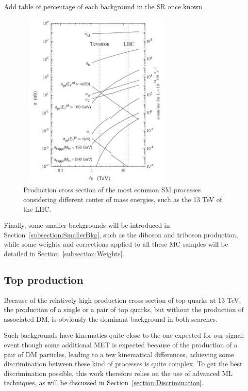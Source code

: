 \documentclass[a4paper, 10pt, openright]{report}
\begin{document}
\color{red} Add table of percentage of each background in the SR once known \color{black}

\begin{figure}[htbp]
\begin{center}
\includegraphics[width=8cm, height=9cm]{figs/ProcessesXS.png}
\caption{Production cross section of the most common \ac{SM} processes considering different center of mass energies, such as the 13 TeV of the \ac{LHC}.}
\label{fig:ProcessesXS}
\end{center}
\end{figure}

Finally, some smaller backgrounds will be introduced in Section~\ref{subsection:SmallerBkg}, such as the diboson and triboson production, while some weights and corrections applied to all these \ac{MC} samples will be detailed in Section~\ref{subsection:Weights}.

\subsection{Top production}

Because of the relatively high production cross section of top quarks at 13 TeV, the production of a single or a pair of top quarks, but without the production of associated \ac{DM}, is obviously the dominant background in both searches. 

Such backgrounds have kinematics quite close to the one expected for our signal: event though some additional \ac{MET} is expected because of the production of a pair of \ac{DM} particles, leading to a few kinematical differences, achieving some discrimination between these kind of processes is quite complex. To get the best discrimination possible, this work therefore relies on the use of advanced \acf{ML} techniques, as will be discussed in Section~\ref{section:Discrimination}.
\end{document}

